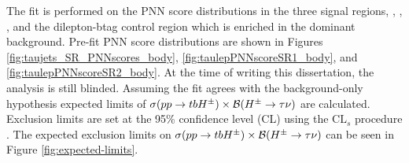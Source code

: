 		The fit is performed on the PNN score distributions in the three signal regions, \taujets, \tauel, \taumu, and the dilepton-btag control region which is enriched in the dominant \ttbar background. Pre-fit PNN score distributions are shown in Figures \ref{fig:taujets_SR_PNNscores_body}, \ref{fig:taulepPNNscoreSR1_body}, and \ref{fig:taulepPNNscoreSR2_body}. At the time of writing this dissertation, the analysis is still blinded. Assuming the fit agrees with the background-only hypothesis expected limits of $\sigma(pp \to tbH^{\pm})\times \mathrm{\cal{B}}(H^{\pm} \to \tau \nu)$ are calculated. Exclusion limits are set at the 95\% confidence level (CL) using the $\mathrm{CL}_s$ procedure \cite{CL-setting}. The expected exclusion limits on $\sigma(pp \to tbH^{\pm})\times \mathrm{\cal{B}}(H^{\pm} \to \tau \nu)$ can be seen in Figure \ref{fig:expected-limits}.

